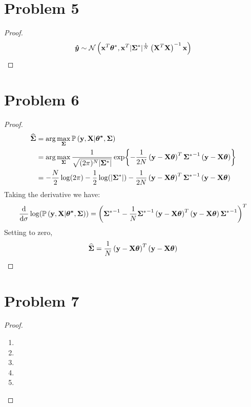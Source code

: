 \documentclass{article}
\begin{document}
\section*{Problem 5}
    \begin{proof}
        $$\vb*{\hat{y}} \sim \mathcal{N}\left(\vb{x}^T \bm{\theta}^*,\vb{x}^T |\bm{\Sigma}^*|^{\frac{1}{N}}\left(\vb{X}^T\vb{X}\right)^{-1} \vb{x} \right)$$
    \end{proof}

\section*{Problem 6}
    \begin{proof}
    \begin{align*}
        \bm{\widehat{\Sigma}}
        &=\arg{\max_{\bm{\Sigma}} \mathbb{P}\left(\vb{y},\vb{X}|\bm{\theta^*}, \bm{\Sigma}\right) }\\
        &=\arg{\max_{\bm{\Sigma}} \frac{1}{\sqrt{(2\pi)^N |\bm{\Sigma}^*|}}\exp{-\frac{1}{2N}\left(\vb{y}-\vb{X}\bm{\theta}\right)^T{\bm{\Sigma}^*}^{-1}\left(\vb{y}-\vb{X}\bm{\theta}\right)} }\\
        &=-\frac{N}{2}\log(2\pi)-\frac{1}{2}\log(|\bm{\Sigma}^*|)-\frac{1}{2N}\left(\vb{y}-\vb{X}\bm{\theta}\right)^T{\bm{\Sigma}^*}^{-1}\left(\vb{y}-\vb{X}\bm{\theta}\right)
    \end{align*}
    Taking the derivative we have:
    $$\frac{\text{d}}{\text{d}\sigma}\log(\mathbb{P}\left(\vb{y},\vb{X}|\bm{\theta^*}, \bm{\Sigma}\right))
    =\left({\bm{\Sigma}^*}^{-1}-\frac{1}{N}{\bm{\Sigma}^*}^{-1}\left(\vb{y}-\vb{X}\bm{\theta}\right)^T\left(\vb{y}-\vb{X}\bm{\theta}\right){\bm{\Sigma}^*}^{-1}\right)^T$$
    Setting to zero,
    $$\bm{\widehat{\Sigma}}=\frac{1}{N}\left(\vb{y}-\vb{X}\bm{\theta}\right)^T\left(\vb{y}-\vb{X}\bm{\theta}\right)$$
    \end{proof}

\section*{Problem 7}
    \begin{proof}
        \indent
        \begin{enumerate}[label=(\alph*)]
            \item
            \item
            \item
            \item
            \item
        \end{enumerate}
    \end{proof}
\end{document}
